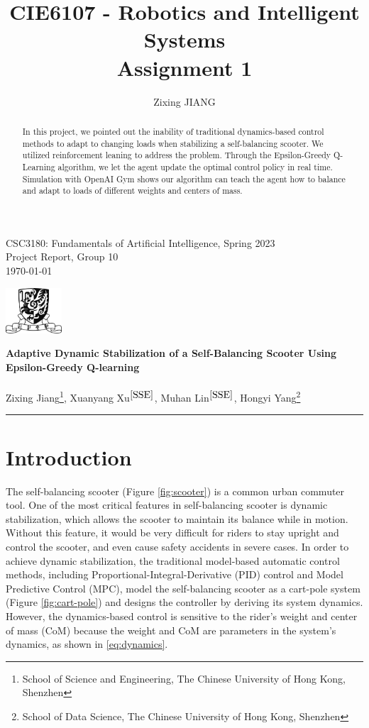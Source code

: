 \documentclass[10pt,a4paper]{article}
\title{\textbf{CIE6107 - Robotics and Intelligent Systems \\Assignment 1}}
\author{Zixing JIANG}
\begin{document}
	
	\begin{flushleft}
		CSC3180: Fundamentals of Artificial Intelligence, Spring 2023\\
		Project Report, Group 10\\
		\today
	\end{flushleft}
	
	\begin{flushright}\vspace{-22mm}
		\includegraphics[height=1.7cm]{figure/logo.png}
	\end{flushright}
	
	\begin{center}\vspace{0.2cm}
		\textbf{\Large Adaptive Dynamic Stabilization of a Self-Balancing Scooter Using Epsilon-Greedy Q-learning}\\~\\
		\large Zixing Jiang\footnote{School of Science and Engineering, The Chinese University of Hong Kong, Shenzhen\label{SSE}}, Xuanyang Xu$^{\ref{SSE}}$, Muhan Lin$^{\ref{SSE}}$, Hongyi Yang\footnote{School of Data Science, The Chinese University of Hong Kong, Shenzhen}
	\end{center}
	{\noindent}\rule{\linewidth}{0.1mm}
	
	\begin{abstract}
		In this project, we pointed out the inability of traditional dynamics-based control methods to adapt to changing loads when stabilizing a self-balancing scooter. We utilized reinforcement leaning to address the problem. Through the Epsilon-Greedy Q-Learning algorithm, we let the agent update the optimal control policy in real time. Simulation with OpenAI Gym shows our algorithm can teach the agent how to balance and adapt to loads of different weights and centers of mass. 
	\end{abstract} 
	
	\section{Introduction}
	The self-balancing scooter (Figure \ref{fig:scooter}) is a common urban commuter tool. One of the most critical features in self-balancing scooter is dynamic stabilization,  which allows the scooter to maintain its balance while in motion. Without this feature, it would be very difficult for riders to stay upright and control the scooter, and even cause safety accidents in severe cases. In order to achieve dynamic stabilization, the traditional model-based automatic control methods, including Proportional-Integral-Derivative (PID) control and Model Predictive Control (MPC), model the self-balancing scooter as a cart-pole system (Figure \ref{fig:cart-pole}) and designs the controller by deriving its system dynamics. However, the dynamics-based control is sensitive to the rider's weight and center of mass (CoM) because the weight and CoM are parameters in the system's dynamics, as shown in \eqref{eq:dynamics}.
	
\end{document}
